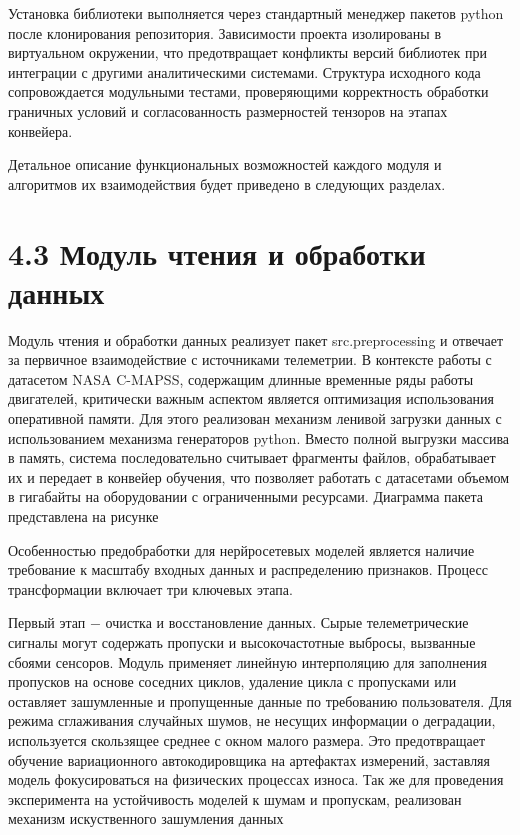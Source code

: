 \documentclass[14pt, a4paper, oneside]{extreport}
\begin{document}
Установка библиотеки выполняется через стандартный менеджер пакетов python после клонирования репозитория. Зависимости проекта изолированы в виртуальном окружении, что предотвращает конфликты версий библиотек при интеграции с другими аналитическими системами. Структура исходного кода сопровождается модульными тестами, проверяющими корректность обработки граничных условий и согласованность размерностей тензоров на этапах конвейера.

Детальное описание функциональных возможностей каждого модуля и алгоритмов их взаимодействия будет приведено в следующих разделах.

\vspace{1em}
\section{4.3 Модуль чтения и обработки данных}
\vspace{1em}

Модуль чтения и обработки данных реализует пакет src.preprocessing и отвечает за первичное взаимодействие с источниками телеметрии. В контексте работы с датасетом NASA C-MAPSS, содержащим длинные временные ряды работы двигателей, критически важным аспектом является оптимизация использования оперативной памяти. Для этого реализован механизм ленивой загрузки данных с использованием механизма генераторов python. Вместо полной выгрузки массива в память, система последовательно считывает фрагменты файлов, обрабатывает их и передает в конвейер обучения, что позволяет работать с датасетами объемом в гигабайты на оборудовании с ограниченными ресурсами. Диаграмма пакета представлена на рисунке 

Особенностью предобработки для нерйросетевых моделей является наличие требование к масштабу входных данных и распределению признаков. Процесс трансформации включает три ключевых этапа.

Первый этап $-$ очистка и восстановление данных. Сырые телеметрические сигналы могут содержать пропуски и высокочастотные выбросы, вызванные сбоями сенсоров. Модуль применяет линейную интерполяцию для заполнения пропусков на основе соседних циклов, удаление цикла с пропусками или оставляет зашумленные и пропущенные данные по требованию пользователя. Для режима сглаживания случайных шумов, не несущих информации о деградации, используется скользящее среднее с окном малого размера. Это предотвращает обучение вариационного автокодировщика на артефактах измерений, заставляя модель фокусироваться на физических процессах износа. Так же для проведения эксперимента на устойчивость моделей к шумам и пропускам, реализован механизм искуственного зашумления данных 
\end{document}
